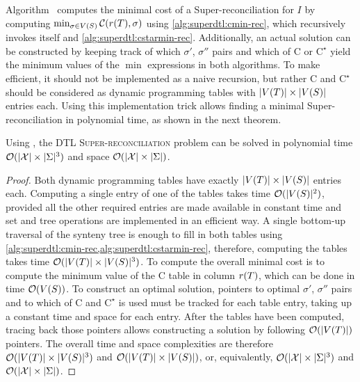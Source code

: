Algorithm~{\superdtl} computes the minimal cost of a Super-reconciliation for \(I\) by computing \(\min_{\sigma \in V(S)}{\mathcal{C}(r(T), \sigma)}\) using \cref{alg:superdtl:cmin-rec}, which recursively invokes itself and \cref{alg:superdtl:cstarmin-rec}.
Additionally, an actual solution can be constructed by keeping track of which \(\sigma'\), \(\sigma''\) pairs and which of \(\mathrm{C}\) or \(\mathrm{C}^\star\) yield the minimum values of the \(\min\) expressions in both algorithms.
To make {\superdtl} efficient, it should not be implemented as a naive recursion, but rather \(\mathrm{C}\) and \(\mathrm{C}^\star\) should be considered as dynamic programming tables with \(|V(T)| \times |V(S)|\) entries each.
Using this implementation trick allows finding a minimal Super-reconciliation in polynomial time, as shown in the next theorem.

\begin{theorem}
    Using {\superdtl}, the \textsc{DTL Super-reconciliation} problem can be solved in polynomial time \(\operatorname{\mathcal{O}}(|\mathcal{X}| \times |\Sigma|^3)\) and space \(\operatorname{\mathcal{O}}(|\mathcal{X}| \times |\Sigma|)\).
\end{theorem}
\begin{proof}
    Both dynamic programming tables have exactly \(|V(T)| \times |V(S)|\) entries each.
    Computing a single entry of one of the tables takes time \(\operatorname{\mathcal{O}}(|V(S)|^2)\), provided all the other required entries are made available in constant time and set and tree operations are implemented in an efficient way.
    A single bottom-up traversal of the synteny tree is enough to fill in both tables using \cref{alg:superdtl:cmin-rec,alg:superdtl:cstarmin-rec}, therefore, computing the tables takes time \(\operatorname{\mathcal{O}}(|V(T)| \times |V(S)|^3)\).
    To compute the overall minimal cost is to compute the minimum value of the \(\mathrm{C}\) table in column \(r(T)\), which can be done in time \(\operatorname{\mathcal{O}}(V(S))\).
    To construct an optimal solution, pointers to optimal \(\sigma'\), \(\sigma''\) pairs and to which of \(\mathrm{C}\) and \(\mathrm{C}^\star\) is used must be tracked for each table entry, taking up a constant time and space for each entry.
    After the tables have been computed, tracing back those pointers allows constructing a solution by following \(\operatorname{\mathcal{O}}(|V(T)|)\) pointers.
    The overall time and space complexities are therefore \(\operatorname{\mathcal{O}}(|V(T)| \times |V(S)|^3)\) and \(\operatorname{\mathcal{O}}(|V(T)| \times |V(S)|)\), or, equivalently, \(\operatorname{\mathcal{O}}(|\mathcal{X}| \times |\Sigma|^3)\) and \(\operatorname{\mathcal{O}}(|\mathcal{X}| \times |\Sigma|)\).
\end{proof}

